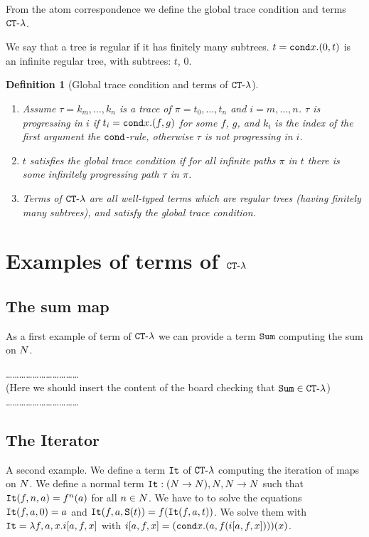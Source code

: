 \documentclass{article}
\newtheorem{definition}[theorem]{Definition}
\begin{document}
From the atom correspondence we define the global trace condition and terms ${ {\tt CT} \mbox{-} \lambda}$.

We say that a tree is regular if it has finitely many subtrees. $t={\tt cond} x.(0,t)$ is an infinite regular tree,
with subtrees: $t$, $0$.

\begin{definition}[Global trace condition and terms of ${ {\tt CT} \mbox{-} \lambda}$]
\begin{enumerate}
\item
Assume $\tau = k_m, \ldots, k_n$ is a trace of $\pi =t_0, \ldots, t_n$ and $i=m,\ldots, n$.
$\tau$ is progressing in $i$ if $t_i={\tt cond} x.(f,g)$ for some $f$, $g$,
and $k_i$ is the index of the first argument the ${\tt cond}$-rule, otherwise $\tau$ is not progressing in $i$.

\item
$t$ satisfies the global trace condition if for all infinite paths $\pi$ in $t$ 
there is some infinitely progressing path $\tau$ in $\pi$.

\item
Terms of ${ {\tt CT} \mbox{-} \lambda}$ are all well-typed terms which are regular trees (having finitely many subtrees), 
and satisfy the global trace condition.

\end{enumerate}
\end{definition}


\section{Examples of terms of ${ {\tt CT} \mbox{-} \lambda}$}

\subsection{The sum map}
As a first example of term of  ${ {\tt CT} \mbox{-} \lambda}$ we can provide a term ${\tt Sum}$ computing the sum on ${N}$.

\ldots\ldots\ldots\ldots\ldots\ldots\ldots\ldots\ldots\ldots\ldots
\\
(Here we should insert the content of the board checking that ${\tt Sum} \in { {\tt CT} \mbox{-} \lambda}$)
\ldots\ldots\ldots\ldots\ldots\ldots\ldots\ldots\ldots\ldots\ldots
\\


\subsection{The Iterator}
A second example. We define a term ${\tt It}$ of  ${ {\tt CT} \mbox{-} \lambda}$ computing the iteration of maps on ${N}$.
We define a normal term ${\tt It}:({N} \rightarrow {N}), {N},{N} \rightarrow {N}$ such that
${\tt It}(f,n,a)=f^n(a)$ for all $n \in {N}$. 
We have to to solve the equations ${\tt It}(f,a,0) = a$ and ${\tt It}(f,a,{\tt S} (t)) = f({\tt It}(f,a,t))$.
We solve them with ${\tt It} = \lambda f, a, x. i[a,f,x]$
with $ i[a,f,x] = ({\tt cond} x. (a, f( i[a,f,x]) ))(x)$.
\end{document}
